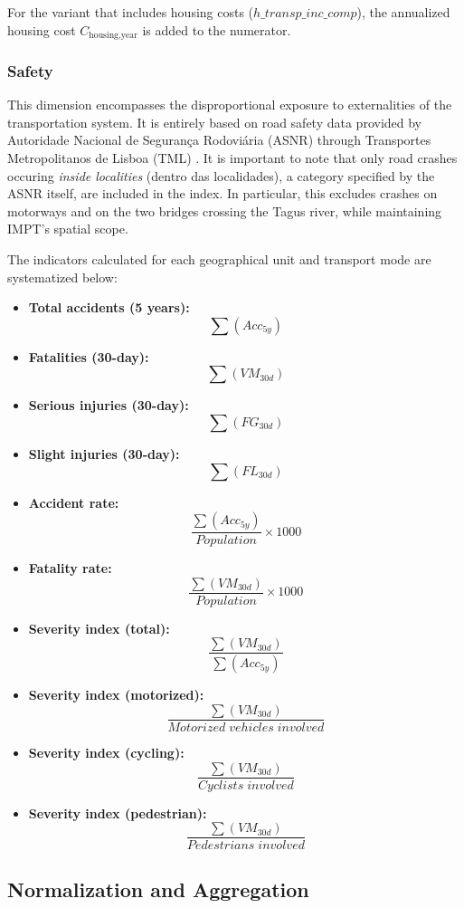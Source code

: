 \documentclass[
  authoryear,
  review,
  1p]{elsarticle}
\providecommand{\tightlist}{%
  \setlength{\itemsep}{0pt}\setlength{\parskip}{0pt}}
\begin{document}
For the variant that includes housing costs (\(h\_transp\_inc\_comp\)),
the annualized housing cost
\(C_{\text{housing,year}}\)\citep{census_2021_housing} is added to the
numerator.

\subsubsection{Safety}\label{sec-MET_safety}

This dimension encompasses the disproportional exposure to externalities
of the transportation system. It is entirely based on road safety data
provided by Autoridade Nacional de Segurança Rodoviária (ASNR) through
Transportes Metropolitanos de Lisboa (TML) \citep{pmmus}. It is
important to note that only road crashes occuring \emph{inside
localities} (dentro das localidades), a category specified by the ASNR
itself, are included in the index. In particular, this excludes crashes
on motorways and on the two bridges crossing the Tagus river, while
maintaining IMPT's spatial scope.

The indicators calculated for each geographical unit and transport mode
are systematized below:

\begin{itemize}
\tightlist
\item
  \textbf{Total accidents (5 years):} \[\sum(Acc_{5y})\]
\item
  \textbf{Fatalities (30-day):} \[\sum(VM_{30d})\]
\item
  \textbf{Serious injuries (30-day):} \[\sum(FG_{30d})\]
\item
  \textbf{Slight injuries (30-day):} \[\sum(FL_{30d})\]
\item
  \textbf{Accident rate:}
  \[\frac{\sum(Acc_{5y})}{Population} \times 1000\]
\item
  \textbf{Fatality rate:}
  \[\frac{\sum(VM_{30d})}{Population} \times 1000\]
\item
  \textbf{Severity index (total):}
  \[\frac{\sum(VM_{30d})}{\sum(Acc_{5y})}\]
\item
  \textbf{Severity index (motorized):}
  \[\frac{\sum(VM_{30d})}{Motorized\; vehicles\; involved}\]
\item
  \textbf{Severity index (cycling):}
  \[\frac{\sum(VM_{30d})}{Cyclists\; involved}\]
\item
  \textbf{Severity index (pedestrian):}
  \[\frac{\sum(VM_{30d})}{Pedestrians\; involved}\]
\end{itemize}

\subsection{Normalization and
Aggregation}\label{sec-MET_normalisation_aggregation}
\end{document}
